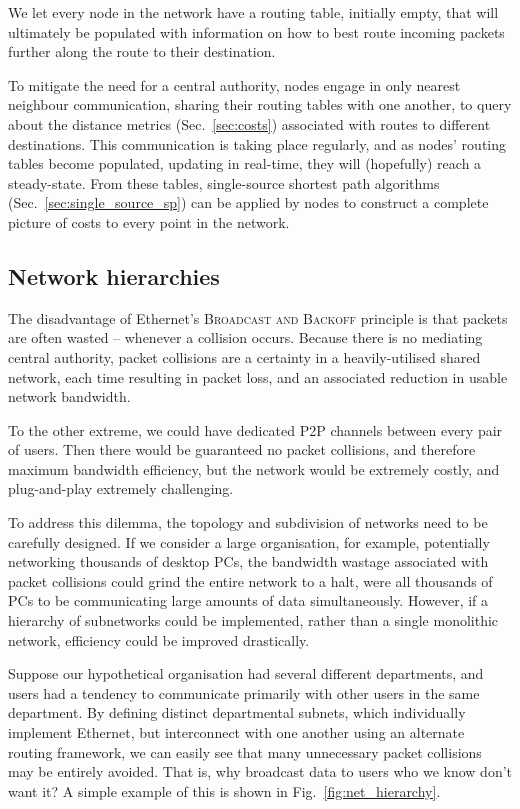 \documentclass[aps,rmp,twocolumn,amsmath,amssymb,nofootinbib,superscriptaddress,longbibliography,floatfix,table-of-contents,eqsecnum]{revtex4-1}
\begin{document}
We let every node in the network have a routing table, initially empty, that will ultimately be populated with information on how to best route incoming packets further along the route to their destination.

To mitigate the need for a central authority, nodes engage in only nearest neighbour communication, sharing their routing tables with one another, to query about the distance metrics (Sec.~\ref{sec:costs}) associated with routes to different destinations. This communication is taking place regularly, and as nodes' routing tables become populated, updating in real-time, they will (hopefully) reach a steady-state. From these tables, single-source shortest path algorithms (Sec.~\ref{sec:single_source_sp}) can be applied by nodes to construct a complete picture of costs to every point in the network.

%
%

\subsection{Network hierarchies} 

The disadvantage of Ethernet's \textsc{Broadcast and Backoff} principle is that packets are often wasted -- whenever a collision occurs. Because there is no mediating central authority, packet collisions are a certainty in a heavily-utilised shared network, each time resulting in packet loss, and an associated reduction in usable network bandwidth.

To the other extreme, we could have dedicated P2P channels between every pair of users. Then there would be guaranteed no packet collisions, and therefore maximum bandwidth efficiency, but the network would be extremely costly, and plug-and-play extremely challenging.

To address this dilemma, the topology and subdivision of networks need to be carefully designed. If we consider a large organisation, for example, potentially networking thousands of desktop PCs, the bandwidth wastage associated with packet collisions could grind the entire network to a halt, were all thousands of PCs to be communicating large amounts of data simultaneously. However, if a hierarchy of subnetworks could be implemented, rather than a single monolithic network, efficiency could be improved drastically.

Suppose our hypothetical organisation had several different departments, and users had a tendency to communicate primarily with other users in the same department. By defining distinct departmental subnets, which individually implement Ethernet, but interconnect with one another using an alternate routing framework, we can easily see that many unnecessary packet collisions may be entirely avoided. That is, why broadcast data to users who we know don't want it? A simple example of this is shown in Fig.~\ref{fig:net_hierarchy}.
\end{document}
